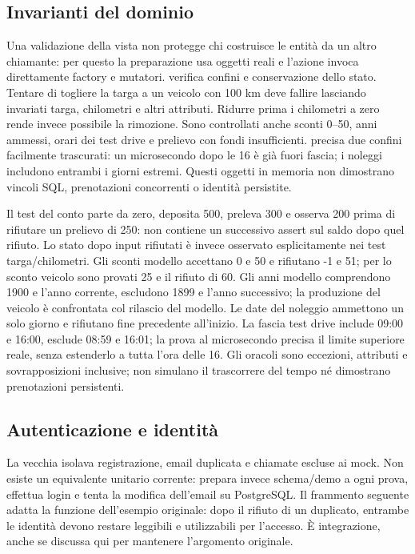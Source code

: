 \subsection{Invarianti del dominio}\label{sec:test-invarianti}
Una validazione della vista non protegge chi costruisce le entità da un
altro chiamante: per questo la preparazione usa oggetti reali e l'azione
invoca direttamente factory e mutatori.
 verifica confini e conservazione dello stato.
Tentare di togliere la targa a un veicolo con 100 km deve fallire lasciando
invariati targa, chilometri e altri attributi. Ridurre prima i chilometri
a zero rende invece possibile la rimozione. Sono controllati anche sconti
0--50, anni ammessi, orari dei test drive e prelievo con fondi insufficienti.
 precisa due confini facilmente trascurati:
un microsecondo dopo le 16 è già fuori fascia; i noleggi includono entrambi
i giorni estremi. Questi oggetti in memoria non dimostrano vincoli SQL,
prenotazioni concorrenti o identità persistite.

Il test del conto parte da zero, deposita 500, preleva 300 e osserva
200 prima di rifiutare un prelievo di 250: non contiene un successivo assert
sul saldo dopo quel rifiuto. Lo stato dopo input rifiutati è invece
osservato esplicitamente nei test targa/chilometri. Gli sconti modello
accettano 0 e 50 e rifiutano -1 e 51; per lo sconto veicolo sono provati
25 e il rifiuto di 60. Gli anni modello comprendono 1900 e l'anno corrente,
escludono 1899 e l'anno successivo; la produzione del veicolo è confrontata
col rilascio del modello. Le date del noleggio ammettono un solo giorno e
rifiutano fine precedente all'inizio. La fascia test drive include 09:00
e 16:00, esclude 08:59 e 16:01; la prova al microsecondo precisa il limite
superiore reale, senza estenderlo a tutta l'ora delle 16.
Gli oracoli sono eccezioni, attributi e sovrapposizioni inclusive; non
simulano il trascorrere del tempo né dimostrano prenotazioni persistenti.

\subsection{Autenticazione e identità}\label{sec:test-identita}
La vecchia  isolava registrazione, email duplicata
e chiamate escluse ai mock. Non esiste un equivalente unitario corrente:
 prepara invece schema/demo a ogni
prova, effettua login e tenta la modifica dell'email su PostgreSQL.
Il frammento seguente adatta la funzione dell'esempio originale: dopo
il rifiuto di un duplicato, entrambe le identità devono restare leggibili
e utilizzabili per l'accesso. È integrazione, anche se discussa qui per
mantenere l'argomento originale.

